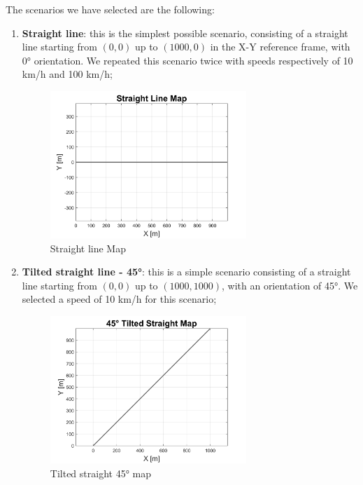 \pagebreak
The scenarios we have selected are the following:
\begin{enumerate}
    \item \textbf{Straight line}: this is the simplest possible scenario, consisting of a straight line starting from $(0,0)$ up to $(1000,0)$ in the X-Y reference frame, with 0° orientation. We repeated this scenario twice with speeds respectively of 10 km/h and 100 km/h;
    \begin{figure}[H]
    \centering
    \includegraphics[width=0.7\textwidth]{Figures/StraightMap.png}
    \caption{Straight line Map}
      \label{fig:StraightMap}
\end{figure}
\vspace{1cm}
    \item \textbf{Tilted straight line - 45°}: this is a simple scenario consisting of a straight line starting from $(0,0)$ up to $(1000,1000)$, with an orientation of 45°. We selected a speed of 10 km/h for this scenario;
    \begin{figure}[H]
    \centering
    \includegraphics[width=0.7\textwidth]{Figures/Tilted45Map.png}
    \caption{Tilted straight 45° map}
      \label{fig:Tilted45Map}
\end{figure}

\end{enumerate}
